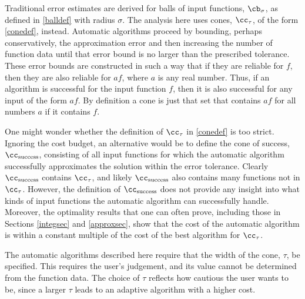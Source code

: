 \documentclass[]{elsarticle}
\theoremstyle{definition}
\theoremstyle{remark}
\begin{document}
Traditional error estimates are derived for balls of input functions, $\cb_{\sigma}$, as defined in \eqref{balldef} with radius $\sigma$.  The analysis here uses cones, $\cc_{\tau}$, of the form \eqref{conedef}, instead.  Automatic algorithms proceed by bounding, perhaps conservatively, the approximation error and then increasing the number of function data until that error bound is no larger than the prescribed tolerance.  These error bounds are constructed in such a way that if they are reliable for $f$, then they are also reliable for $af$, where $a$ is any real number.  Thus, if an algorithm is successful for the input function $f$, then it is also successful for any input of the form $af$.  By definition a cone is just that set that contains $af$ for all numbers $a$ if it contains $f$.

One might wonder whether the definition of $\cc_{\tau}$ in \eqref{conedef} is too strict.  Ignoring the cost budget, an alternative would be to define the cone of success, $\cc_{\text{success}}$, consisting of all input functions for which the automatic algorithm successfully approximates the solution within the error tolerance.  Clearly $\cc_{\text{success}}$ contains $\cc_{\tau}$, and likely $\cc_{\text{success}}$ also contains many functions not in $\cc_{\tau}$.  However, the definition of $\cc_{\text{success}}$ does not provide any insight into what kinds of input functions the automatic algorithm can successfully handle.  Moreover, the optimality results that one can often prove, including those in Sections \ref{integsec} and \ref{approxsec}, show that the cost of the automatic algorithm is within a constant multiple of the cost of the best algorithm for $\cc_{\tau}$.

The automatic algorithms described here require that the width of the cone, $\tau$, be specified.  This requires the user's judgement, and its value cannot be determined from the function data.  The choice of $\tau$ reflects how cautious the user wants to be, since a larger $\tau$ leads to an adaptive algorithm with a higher cost. 
\end{document}
